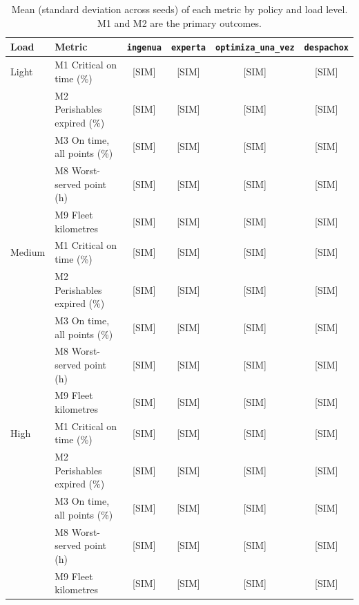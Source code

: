 \documentclass[11pt]{article}
\newcommand{\code}[1]{\texttt{\small #1}}
\begin{document}
\begin{table}[ht]
\centering
\small
\caption{Mean (standard deviation across seeds) of each metric by policy and load level. M1 and M2 are the primary outcomes.}
\label{tab:means}
\begin{tabular}{llcccc}
\toprule
Load & Metric & \code{ingenua} & \code{experta} & \code{optimiza\_una\_vez} & \code{despachox} \\
\midrule
Light & M1 Critical on time (\%) & [SIM] & [SIM] & [SIM] & [SIM] \\
      & M2 Perishables expired (\%) & [SIM] & [SIM] & [SIM] & [SIM] \\
      & M3 On time, all points (\%) & [SIM] & [SIM] & [SIM] & [SIM] \\
      & M8 Worst-served point (h) & [SIM] & [SIM] & [SIM] & [SIM] \\
      & M9 Fleet kilometres & [SIM] & [SIM] & [SIM] & [SIM] \\
\midrule
Medium & M1 Critical on time (\%) & [SIM] & [SIM] & [SIM] & [SIM] \\
       & M2 Perishables expired (\%) & [SIM] & [SIM] & [SIM] & [SIM] \\
       & M3 On time, all points (\%) & [SIM] & [SIM] & [SIM] & [SIM] \\
       & M8 Worst-served point (h) & [SIM] & [SIM] & [SIM] & [SIM] \\
       & M9 Fleet kilometres & [SIM] & [SIM] & [SIM] & [SIM] \\
\midrule
High & M1 Critical on time (\%) & [SIM] & [SIM] & [SIM] & [SIM] \\
     & M2 Perishables expired (\%) & [SIM] & [SIM] & [SIM] & [SIM] \\
     & M3 On time, all points (\%) & [SIM] & [SIM] & [SIM] & [SIM] \\
     & M8 Worst-served point (h) & [SIM] & [SIM] & [SIM] & [SIM] \\
     & M9 Fleet kilometres & [SIM] & [SIM] & [SIM] & [SIM] \\
\bottomrule
\end{tabular}
\end{table}
\end{document}
